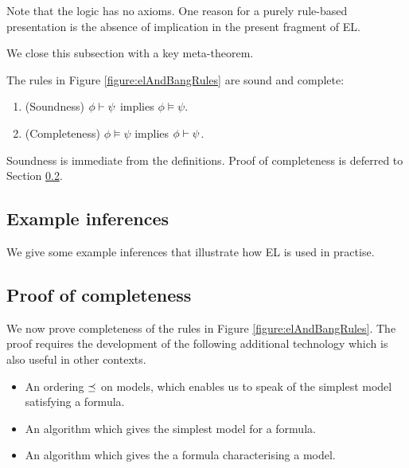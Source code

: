 Note that the logic has no axioms. One reason for a purely rule-based
presentation is the absence of implication in the present fragment of
EL. 

We close this subsection with a key meta-theorem.

\begin{theorem}\label{theorem:elAndBang:soundComplete}
The rules in Figure \ref{figure:elAndBangRules} are sound and complete:
\begin{enumerate}

\item\label{theorem:elAndBang:sound} (Soundness) $\phi \vdash \psi$ implies $\phi \models \psi$.

\item\label{theorem:elAndBang:complete} (Completeness) $\phi \models \psi$ implies $\phi \vdash \psi$.

\end{enumerate}
\end{theorem}

\NI Soundness is immediate from the definitions. Proof of completeness is
deferred to Section \ref{completenessProof}. 

\subsection{Example inferences}

We give some example inferences that illustrate how EL is used in
practise.

\subsection{Proof of completeness}\label{completenessProof}

\NI We now prove completeness of the rules in Figure
\ref{figure:elAndBangRules}.  The proof requires the development of
the following additional technology which is also useful in other
contexts.

\begin{itemize}

\item An ordering $\preceq$ on models, which enables us to speak of
  the simplest model satisfying a formula.

\item An algorithm which gives the simplest model for a formula.

\item An algorithm which gives the a formula characterising a model.

\end{itemize}

